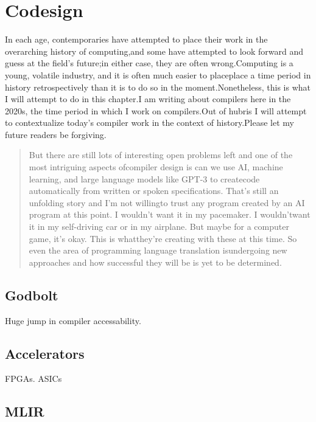 \chapter{Codesign}
In each age, contemporaries have attempted to place their work in the 
overarching history of computing,and some have attempted to look forward and 
guess at the field's future;in either case, they are often wrong.Computing is a 
young, volatile industry, and it is often much easier to placeplace a time 
period in history retrospectively than it is to do so in the 
moment.Nonetheless, this is what I will attempt to do in this chapter.I am 
writing about compilers here in the 2020s, the time period in which I work on 
compilers.Out of hubris I will attempt to contextualize today's compiler work 
in the context of history.Please let my future readers be 
forgiving.\begin{quotation}
But there are still lots of interesting open problems left and one of the most 
intriguing aspects ofcompiler design is can we use AI, machine learning, and 
large language models like GPT-3 to createcode automatically from written or 
spoken specifications. That's still an unfolding story and I'm not willingto 
trust any program created by an AI program at this point. I wouldn't want it in 
my pacemaker. I wouldn'twant it in my self-driving car or in my airplane. But 
maybe for a computer game, it's okay. This is whatthey're creating with these 
at this time. So even the area of programming language translation isundergoing 
new approaches and how successful they will be is yet to be 
determined.\cite{aho_oral_history_2022}
\end{quotation}
\section{Godbolt}
Huge jump in compiler accessability\cite{godbolt_happy_birthday_ce_2022}.
\section{Accelerators}
FPGAs. ASICs
\section{MLIR}
